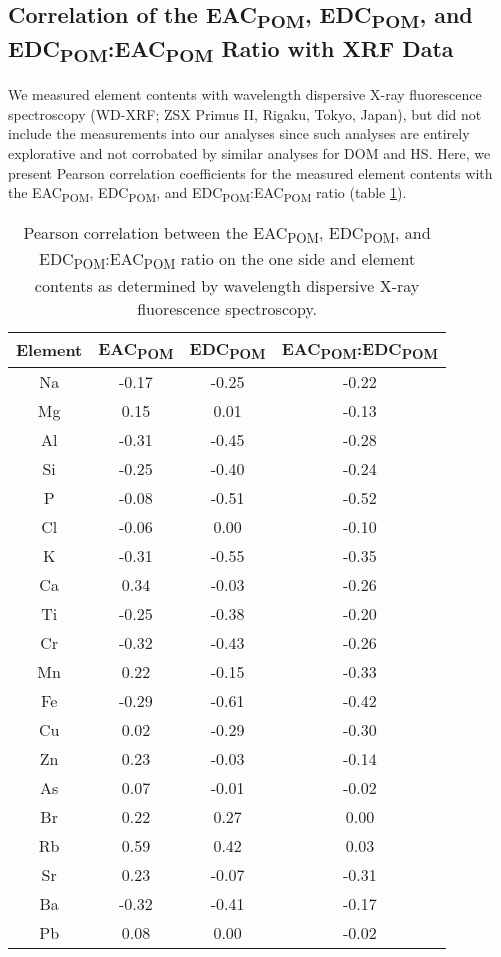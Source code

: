 \documentclass[alpha-refs]{wiley-article-rmd}
\begin{document}
\begin{refsection}
\hypertarget{correlation-of-the-eac-edc-and-edceac-ratio-with-xrf-data}{%
\subsection{\texorpdfstring{Correlation of the EAC\textsubscript{POM}, EDC\textsubscript{POM}, and EDC\textsubscript{POM}:EAC\textsubscript{POM} Ratio with XRF Data}{Correlation of the EAC, EDC, and EDC:EAC Ratio with XRF Data}}\label{correlation-of-the-eac-edc-and-edceac-ratio-with-xrf-data}}

We measured element contents with wavelength dispersive X-ray fluorescence spectroscopy (WD-XRF; ZSX Primus II, Rigaku, Tokyo, Japan), but did not include the measurements into our analyses since such analyses are entirely explorative and not corrobated by similar analyses for DOM and HS. Here, we present Pearson correlation coefficients for the measured element contents with the EAC\textsubscript{POM}, EDC\textsubscript{POM}, and EDC\textsubscript{POM}:EAC\textsubscript{POM} ratio (table \ref{tab:t-cor-el-xrf}).

\begin{table}

\caption{\label{tab:t-cor-el-xrf}Pearson correlation between the EAC\textsubscript{POM}, EDC\textsubscript{POM}, and EDC\textsubscript{POM}:EAC\textsubscript{POM} ratio on the one side and element contents as determined by wavelength dispersive X-ray fluorescence spectroscopy.}
\centering
\begin{tabular}[t]{cccc}
\toprule
Element & EAC\textsubscript{POM} & EDC\textsubscript{POM} & EAC\textsubscript{POM}:EDC\textsubscript{POM}\\
\midrule
Na & -0.17 & -0.25 & -0.22\\
Mg & 0.15 & 0.01 & -0.13\\
Al & -0.31 & -0.45 & -0.28\\
Si & -0.25 & -0.40 & -0.24\\
P & -0.08 & -0.51 & -0.52\\
\addlinespace
Cl & -0.06 & 0.00 & -0.10\\
K & -0.31 & -0.55 & -0.35\\
Ca & 0.34 & -0.03 & -0.26\\
Ti & -0.25 & -0.38 & -0.20\\
Cr & -0.32 & -0.43 & -0.26\\
\addlinespace
Mn & 0.22 & -0.15 & -0.33\\
Fe & -0.29 & -0.61 & -0.42\\
Cu & 0.02 & -0.29 & -0.30\\
Zn & 0.23 & -0.03 & -0.14\\
As & 0.07 & -0.01 & -0.02\\
\addlinespace
Br & 0.22 & 0.27 & 0.00\\
Rb & 0.59 & 0.42 & 0.03\\
Sr & 0.23 & -0.07 & -0.31\\
Ba & -0.32 & -0.41 & -0.17\\
Pb & 0.08 & 0.00 & -0.02\\
\bottomrule
\end{tabular}
\end{table}


\end{refsection}
\end{document}
